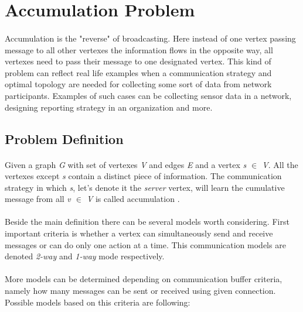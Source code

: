 \documentclass[a4paper,TexShade]{class}
\begin{document}
\maketitle

\tableofcontents


\newpage
\section{Accumulation Problem}

\paragraph{} Accumulation is the "reverse" of broadcasting. Here instead of one vertex passing message to all other vertexes the information flows in the opposite way, all vertexes need to pass their message to one designated vertex. This kind of problem can reflect real life examples when a communication strategy and optimal topology are needed for collecting some sort of data from network participants. Examples of such cases can be collecting sensor data in a network, designing reporting strategy in an organization and more.

\subsection{Problem Definition}
\paragraph{} Given a graph \textit{G} with set of vertexes \textit{V} and edges \textit{E} and a vertex \textit{s $\in$ V}. All the vertexes except \textit{s} contain a distinct piece of information. The communication strategy in which \textit{s}, let's denote it the \textit{server} vertex, will learn the cumulative message from all \textit{v $\in$ V} is called accumulation \cite{book}. 

\paragraph{} Beside the main definition there can be several models worth considering. First important criteria is whether a vertex can simultaneously send and receive messages or can do only one action at a time. This communication models are denoted \textit{2-way} and \textit{1-way} mode respectively. 

\paragraph{} More models can be determined depending on communication buffer criteria, namely how many messages can be sent or received using given connection. Possible models based on this criteria are following:
\end{document}
